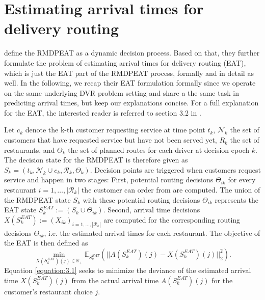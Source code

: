 \section{Estimating arrival times for delivery routing}

\cite{Hildebrandt2020_EAT} define the RMDPEAT as a dynamic decision process. Based on that, they further formulate the problem of estimating arrival times for delivery routing (EAT), which is just the EAT part of the RMDPEAT process, formally and in detail as well. In the following, we recap their EAT formulation formally since we operate on the same underlying DVR problem setting and share a the same task in predicting arrival times, but keep our explanations concise. For a full explanation for the EAT, the interested reader is referred to section 3.2 in \cite{Hildebrandt2020_EAT}. 

Let $ c_k $ denote the k-th customer requesting service at time point $ t_k $, $ \mathcal{N}_k $ the set of customers that have requested service but have not been served yet, $ R_k $ the set of restaurants, and $ \Theta_k $ the set of planned routes for each driver at decision epoch $ k $. The decision state for the RMDPEAT is therefore given as $ S_k = (t_k, \mathcal{N}_k \cup c_k, \mathcal{R}_k, \Theta_k) $. Decision points are triggered when customers request service and happen in two stages: First, potential routing decisions $ \Theta_{ik} $ for every restaurant $ i = 1, \dots, |\mathcal{R}_k| $ the customer can order from are computed. The union of the RMDPEAT state $ S_k $ with these potential routing decisions $ \Theta_{ik} $ represents the EAT state $ S^{EAT}_k := (S_k \cup \Theta_{ik})$. Second, arrival time decisions $ X(S^{EAT}_k) := (X_{ik})_{i = 1, \dots, |\mathcal{R}_k|}$ are computed for the corresponding routing decisions $ \Theta_{ik} $, i.e. the estimated arrival times for each restaurant. The objective of the EAT is then defined as
\begin{equation}\label{equation:3.1}
	\min_{X(S^{EAT}_k)(j) \in \mathbb{R}_+} 
	\mathbb{E}_{S^{EAT}_{k}} 
	(|| A(S^{EAT}_{k})(j) - X(S^{EAT}_{k})(j)||^{2}_{2}).
\end{equation}
Equation \ref{equation:3.1} seeks to minimize the deviance of the estimated arrival time $ X(S^{EAT}_{k})(j) $ from the actual arrival time $ A(S^{EAT}_{k})(j) $ for the customer's restaurant choice $ j $.

